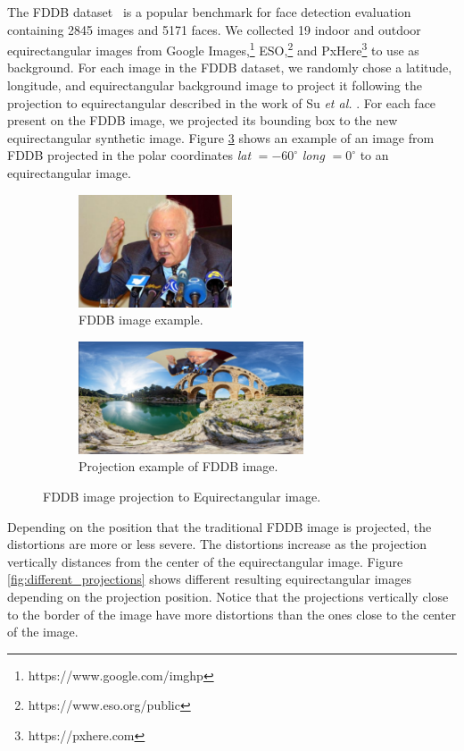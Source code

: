 The FDDB dataset~\cite{jain2010fddb} is a popular benchmark for face detection evaluation containing 2845 images and 5171 faces. We collected 19 indoor and outdoor equirectangular images from Google Images,\footnote{https://www.google.com/imghp} ESO,\footnote{https://www.eso.org/public} and PxHere\footnote{https://pxhere.com} to use as background.
For each image in the FDDB dataset, we randomly chose a latitude, longitude, and equirectangular background image to project it following the projection to equirectangular described in the work of Su \emph{et al.} \cite{su2017learning}.
For each face present on the FDDB image, we projected its bounding box to the new equirectangular synthetic image. Figure \ref{fig:authoring_fddb_proj} shows an example of an image from FDDB projected in the polar coordinates \emph{lat} $ = -60^{\circ}$ \emph{long} $ = 0^{\circ}$ to an equirectangular image.

\begin{figure}[!ht]
\centering
    \begin{subfigure}{0.4\linewidth}
        \centering
        \includegraphics[height=9em]{img/video360/face_pre.png}
        \caption{FDDB image example.}
        \label{subfig:face_pre}
    \end{subfigure}\hfill
    \begin{subfigure}{0.55\linewidth}
        \centering
         \includegraphics[height=9em]{img/video360/face_pos.png}
        \caption{Projection example of FDDB image.}
        \label{subfig:face_pos}
    \end{subfigure}

\caption{FDDB image projection to Equirectangular image.}
\label{fig:authoring_fddb_proj}
\end{figure}

Depending on the position that the traditional FDDB image is projected, the distortions are more or less severe. The distortions increase as the projection vertically distances from the center of the equirectangular image. Figure \ref{fig:different_projections} shows different resulting equirectangular images depending on the projection position. Notice that the projections vertically close to the border of the image have more distortions than the ones close to the center of the image.

